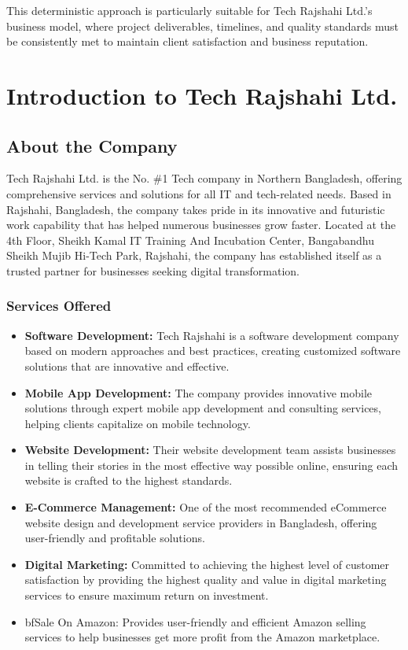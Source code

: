 \documentclass[12pt,a4paper]{article}
\begin{document}
This deterministic approach is particularly suitable for Tech Rajshahi Ltd.'s business model, where project deliverables, timelines, and quality standards must be consistently met to maintain client satisfaction and business reputation.

\clearpage
\section{Introduction to Tech Rajshahi Ltd.}

\subsection{About the Company}
Tech Rajshahi Ltd. is the No. \#1 Tech company in Northern Bangladesh, offering comprehensive services and solutions for all IT and tech-related needs. Based in Rajshahi, Bangladesh, the company takes pride in its innovative and futuristic work capability that has helped numerous businesses grow faster. Located at the 4th Floor, Sheikh Kamal IT Training And Incubation Center, Bangabandhu Sheikh Mujib Hi-Tech Park, Rajshahi, the company has established itself as a trusted partner for businesses seeking digital transformation.

\subsubsection{Services Offered}
\begin{itemize}
    \item {\bf{Software Development:}} Tech Rajshahi is a software development company based on modern approaches and best practices, creating customized software solutions that are innovative and effective.
    
    \item {\bf{Mobile App Development:}} The company provides innovative mobile solutions through expert mobile app development and consulting services, helping clients capitalize on mobile technology.
    
    \item {\bf{Website Development:}} Their website development team assists businesses in telling their stories in the most effective way possible online, ensuring each website is crafted to the highest standards.
    
    \item {\bf{E-Commerce Management:}} One of the most recommended eCommerce website design and development service providers in Bangladesh, offering user-friendly and profitable solutions.
    
    \item {\bf{Digital Marketing:}} Committed to achieving the highest level of customer satisfaction by providing the highest quality and value in digital marketing services to ensure maximum return on investment.
    
    \item {bf{Sale On Amazon:}} Provides user-friendly and efficient Amazon selling services to help businesses get more profit from the Amazon marketplace.
\end{itemize}
\end{document}
